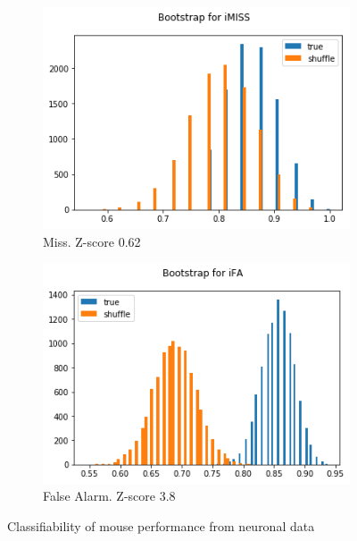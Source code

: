 \documentclass[a4paper,10pt]{article}
\begin{document}
\begin{figure}
\begin{subfigure}[b]{0.4\textwidth}
        \includegraphics[width=\textwidth]{img/example_neuro_classifiability_miss.png}
        \caption{Miss. Z-score 0.62}
        \label{fig:neuro_classifiability_miss}
    \end{subfigure}\hspace{0.05\textwidth}
    \begin{subfigure}[b]{0.4\textwidth}
        \includegraphics[width=\textwidth]{img/example_neuro_classifiability_fa.png}
        \caption{False Alarm. Z-score 3.8}
        \label{fig:neuro_classifiability_fa}
    \end{subfigure}
    \caption{Classifiability of mouse performance from neuronal data}\label{fig:neuro_classifiability}
\end{figure}
\end{document}
